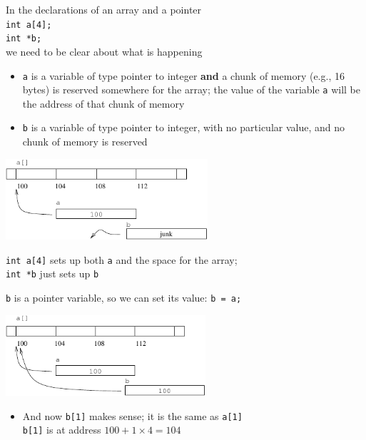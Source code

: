 \documentclass{beamer}
\def\code#1{{\ifmmode\else\large\fi\tt#1}}
\begin{document}
\begin{frame}

In the declarations of an array and a pointer\\
\code{int a[4];\\int *b;}\\
we need to be clear about what is happening
\begin{itemize}
\item{\code{a} is a variable of type pointer to integer {\bf and} a
  chunk of memory (e.g., 16 bytes) is reserved somewhere for the array; the
  value of the variable \code{a} will be the address of that chunk of memory}

\item{\code{b} is a variable of type pointer to integer, with no
  particular value, and no chunk of memory is reserved}
\end{itemize}
\end{frame}

\begin{frame}
\begin{center}
\includegraphics[height=3cm, keepaspectratio]{Pics/ptrarray3}
\end{center}

\code{int a[4]} sets up both \code{a} and the space for the array; \\
\code{int *b} just sets up \code{b}
\end{frame}

\begin{frame}
\code{b} is a pointer variable, so we can set its value: \code{b = a;}
\begin{center}
\includegraphics[height=3cm, keepaspectratio]{Pics/ptrarray4}
\end{center}
\begin{itemize}
\item{And now \code{b[1]} makes sense; it is the same as \code{a[1]}\\
\code{b[1]} is at address $100 + 1\times4 = 104$}
\end{itemize}
\end{frame}
\end{document}
